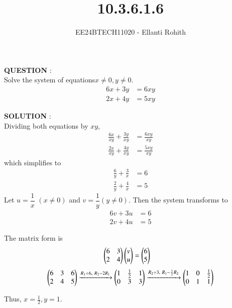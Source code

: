 \documentclass[journal]{IEEEtran}
\begin{document}

\vspace{3cm}



\title{10.3.6.1.6}
\author{EE24BTECH11020 - Ellanti Rohith}
{\let\newpage\relax\maketitle}

\textbf{QUESTION} : \\
Solve the system of equations$x\neq0,y\neq0$.
\begin{align}
    6x + 3y &= 6xy \label{eq:qn1} \\
    2x + 4y &= 5xy \label{eq:qn2}
\end{align}


\textbf{SOLUTION} : \\
Dividing both equations by $xy$,
\begin{align}
    \frac{6x}{xy} + \frac{3y}{xy} &= \frac{6xy}{xy} \\
    \frac{2x}{xy} + \frac{4y}{xy} &= \frac{5xy}{xy}
\end{align}
which simplifies to
\begin{align}
    \frac{6}{y} + \frac{3}{x} &= 6 \label{eq:trans1} \\
    \frac{2}{y} + \frac{4}{x} &= 5 \label{eq:trans2}
\end{align}
Let $u = \dfrac{1}{x}$ $(x \neq 0)$ and $v = \dfrac{1}{y}(y\neq 0)$. Then the system transforms to
\begin{align}
    6v + 3u &= 6 \label{eq:lin1} \\
    2v + 4u &= 5 \label{eq:lin2}
\end{align}

The matrix form is
\begin{align}
    \begin{pmatrix}6 & 3 \\ 2 & 4\end{pmatrix} \begin{pmatrix}v \\ u\end{pmatrix} &= \begin{pmatrix}6 \\ 5\end{pmatrix}
\end{align}
\[
\begin{pmatrix}
6 & 3 & 6 \\
2 & 4 & 5
\end{pmatrix}
\xrightarrow{R_1 \div 6, \ R_2 - 2R_1}
\begin{pmatrix}1 & \frac{1}{2} & 1 \\
0 & 3 & 3
\end{pmatrix}\xrightarrow{R_2 \div 3, \ R_1 - \frac{1}{2} R_2}
\begin{pmatrix}1 & 0 & \frac{1}{2} \\
0 & 1 & 1
\end{pmatrix}\]

Thus, \( x = \frac{1}{2}, y = 1 \).
\end{document}
